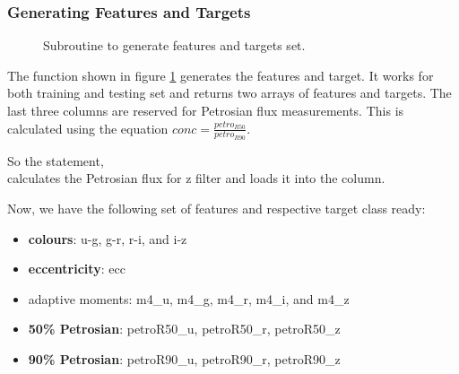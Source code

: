 \subsubsection{Generating Features and Targets}
\begin{figure}[H]
	\centering
	\caption{Subroutine to generate features and targets set.}
	\label{fig:gft}
\end{figure}

The function shown in figure \ref{fig:gft} generates the features and target. It works for both training and testing set and returns two  arrays of features and targets. The last three columns are reserved for Petrosian flux measurements. This is calculated using the equation $conc = \frac{petro_{R50}}{petro_{R90}}$.

So the statement,\\
 calculates the Petrosian flux for z filter and loads it into the  column.


Now, we have the following set of features and respective target class ready:
\begin{itemize}
	\item \textbf{colours}: u-g, g-r, r-i, and i-z
	\item \textbf{eccentricity}: ecc
	\item {} adaptive moments: m4\_u, m4\_g, m4\_r, m4\_i, and m4\_z
	\item \textbf{50\% Petrosian}: petroR50\_u, petroR50\_r, petroR50\_z
	\item \textbf{90\% Petrosian}: petroR90\_u, petroR90\_r, petroR90\_z
\end{itemize}

